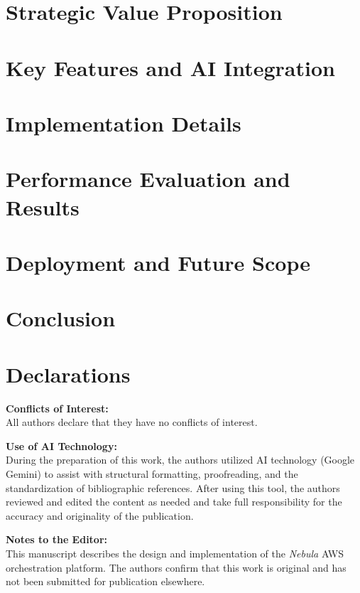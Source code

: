 \documentclass[11pt,conference,onecolumn]{IEEEtran}
\begin{document}
\section{Strategic Value Proposition}


\section{Key Features and AI Integration}


\section{Implementation Details}


\section{Performance Evaluation and Results}


\section{Deployment and Future Scope}



\section{Conclusion}




\section*{Declarations}
\textbf{Conflicts of Interest:}\\
All authors declare that they have no conflicts of interest.

\textbf{Use of AI Technology:}\\
During the preparation of this work, the authors utilized AI technology (Google Gemini) to assist with structural formatting, proofreading, and the standardization of bibliographic references. After using this tool, the authors reviewed and edited the content as needed and take full responsibility for the accuracy and originality of the publication.

\textbf{Notes to the Editor:}\\
This manuscript describes the design and implementation of the \textit{Nebula} AWS orchestration platform. The authors confirm that this work is original and has not been submitted for publication elsewhere.



\end{document}
